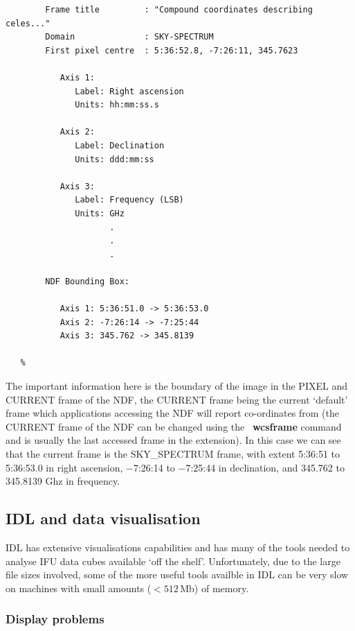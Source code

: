 \documentclass[twoside,11pt]{article}
\newcommand{\htmladdnormallink}[2]{#1}
\newcommand{\xref}[3]{#1}
\newcommand{\xlabel}[1]{}
\begin{document}
\begin{\htmlonly}
{\begin{verbatim}
        Frame title         : "Compound coordinates describing celes..."
        Domain              : SKY-SPECTRUM
        First pixel centre  : 5:36:52.8, -7:26:11, 345.7623

           Axis 1:
              Label: Right ascension
              Units: hh:mm:ss.s

           Axis 2:
              Label: Declination
              Units: ddd:mm:ss

           Axis 3:
              Label: Frequency (LSB)
              Units: GHz
                     .
                     .
                     .

        NDF Bounding Box:

           Axis 1: 5:36:51.0 -> 5:36:53.0
           Axis 2: -7:26:14 -> -7:25:44
           Axis 3: 345.762 -> 345.8139

   %
\end{verbatim}\normalsize

The important information here is the boundary of the image in the
PIXEL and CURRENT frame of the NDF, the CURRENT frame being the
current `default' frame which applications accessing the NDF will
report co-ordinates from (the CURRENT frame of the NDF can be changed
using the \KAPPA\ \xref{{\bf wcsframe}}{sun95}{WCSFRAME} command and is
usually the last accessed frame in the extension).  In this case we can
see that the current frame is the SKY\_SPECTRUM frame, with extent
5:36:51 to 5:36:53.0 in right ascension, $-$7:26:14 to $-$7:25:44 in
declination, and 345.762 to 345.8139 Ghz in frequency.


\subsection{\xlabel{sc16_idl}IDL and data visualisation\label{sc16_idl}}

\htmladdnormallink{IDL}{http://www.rsinc.com/} has extensive
visualisations capabilities and has many of the tools needed to
analyse IFU data cubes available `off the shelf'.  Unfortunately, due
to the large file sizes involved, some of the more useful tools
availble in IDL can be very slow on machines with small amounts
($<512$\,Mb) of memory.

\subsubsection{Display problems}

}
\end{\htmlonly}
\end{document}
